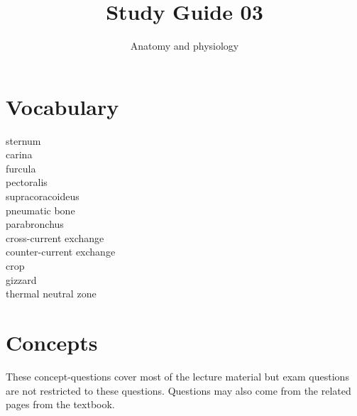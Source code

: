 \documentclass[nofonts, letterpaper]{tufte-handout}
\title{Study Guide 03}
\author{Anatomy and physiology}
\date{} %
\begin{document}
\maketitle	%


\section{Vocabulary}
\vspace{-1\baselineskip}
\begin{multicols}{2}
sternum \\
carina \\
furcula \\
pectoralis \\
supracoracoideus \\
pneumatic bone \\
parabronchus \\
cross-current exchange \\
counter-current exchange  \\
crop \\
gizzard \\
thermal neutral zone 
\end{multicols}

\section{Concepts}

These concept-questions cover most of the lecture material but exam questions are not restricted to these questions. Questions may also come from the related pages from the textbook.\vspace{\baselineskip}
\end{document}
